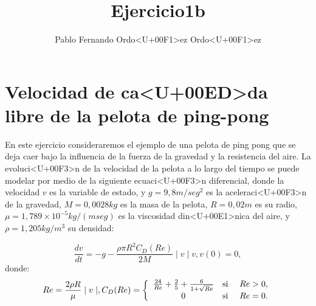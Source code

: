 \documentclass[12pt,a4paper]{article}
\title{Ejercicio1b}
\author{Pablo Fernando Ordo<U+00F1>ez Ordo<U+00F1>ez}
\begin{document}



\maketitle
\thispagestyle{fancy}

\section*{Velocidad de ca<U+00ED>da libre de la pelota de ping-pong}
En este ejercicio consideraremos el ejemplo de una pelota de ping pong que se deja caer bajo la influencia de la fuerza de la gravedad y la resistencia del aire.
La evoluci<U+00F3>n de la velocidad de la pelota a lo largo del tiempo se puede modelar por medio de la siguiente ecuaci<U+00F3>n diferencial, donde la velocidad $v$ es la variable de estado, y $g = 9,8m/seg^{2}$  es la aceleraci<U+00F3>n de la gravedad, $M = 0,0028kg$ es la masa de la pelota, $R = 0,02m$ es su radio, $\mu = 1,789 \times 10^{-5} kg/(m seg)$ es la viscosidad din<U+00E1>nica del aire, y $\rho = 1,205 kg/m^{3}$ su densidad:

\begin{equation}
\frac{dv}{dt}=-g-\frac{\rho\pi R^{2}C_{D}(Re)}{2M}\mid v \mid v,    v(0)=0,
\end{equation}
donde:
\begin{align*}
Re = \frac{2\rho R}{\mu} \mid v \mid,  
C_{D}(Re) =
\left\lbrace
\begin{array}{ccc}
\frac{24}{Re}+\frac{2}{5}+\frac{6}{1+\sqrt{Re}} &\textup{si } &Re > 0, \\
0 &\textup{si } &Re = 0. 
\end{array}
\right.
\end{align*}
\end{document}
